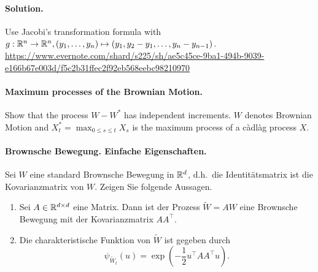 \paragraph*{Solution.} Use Jacobi's transformation formula with
$g:\mathbb R^{n}\to\mathbb R^{n}, (y_1,\dots ,y_n)\mapsto(y_1, y_2-y_1,\dots
,y_n-y_{n-1})$. 
\url{https://www.evernote.com/shard/s225/sh/ae5c45ce-9ba1-494b-9039-e166b67e003d/f5c2b31ffec2f92eb568eebc98210970}


\paragraph{Maximum processes of the Brownian Motion. } Show that the process $W
- W^*$ has independent increments. $W$ denotes Brownian Motion and $X^*_t=
\max_{0 \leq s \leq t} X_s$ is the maximum process of a c\`adl\`ag process $X$.


\paragraph{Brownsche Bewegung. Einfache Eigenschaften.}
Sei $W$ eine standard Brownsche Bewegung in $\mathbb R^d$, d.h.\ die Identitätsmatrix
ist die Kovarianzmatrix von $W$. Zeigen Sie folgende Aussagen. 
\begin{enumerate}
    \item Sei $A\in \mathbb R^{d \times d}$ eine Matrix. Dann ist der Prozess $\tilde W = AW$ eine
        Brownsche Bewegung mit der Kovarianzmatrix $A A^{\top}$. 
    \item Die charakteristische Funktion von $\tilde W$ ist gegeben durch
        \begin{equation*}
            \psi_{\tilde W_t} (u) = \exp \left( -\frac{1}{2} u^{\top} A A^{\top} u \right).
        \end{equation*}
\end{enumerate}

